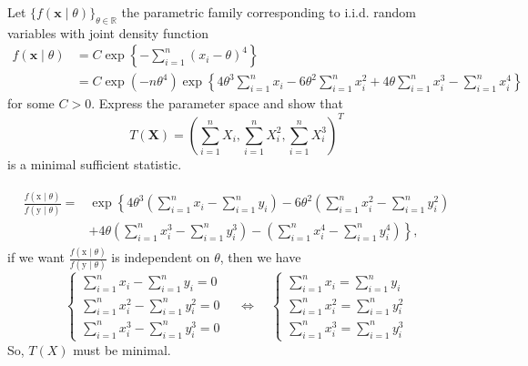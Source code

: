 \begin{ex}
    Let \(\{f(\mathbf{x} \mid \theta)\}_{\theta \in \mathbb{R}}\) the parametric family corresponding to i.i.d. random variables with joint density function
    \[
        \begin{aligned}
            f(\mathbf{x} \mid \theta)&=C \exp \left\{-\sum_{i=1}^{n}\left(x_{i}-\theta\right)^{4}\right\}\\
            &=C \exp \left(-n \theta^{4}\right) \exp \left\{4 \theta^{3} \sum_{i=1}^{n} x_{i}-6 \theta^{2} \sum_{i=1}^{n} x_{i}^{2}+4 \theta \sum_{i=1}^{n} x_{i}^{3}-\sum_{i=1}^{n} x_{i}^{4}\right\}
        \end{aligned}
    \]
    for some \(C>0\). Express the parameter space and show that
    \[
        T(\mathbf{X})=\left(\sum_{i=1}^{n} X_{i}, \sum_{i=1}^{n} X_{i}^{2}, \sum_{i=1}^{n} X_{i}^{3}\right)^T
    \]
    is a minimal sufficient statistic. 
\end{ex}

\begin{solution}
    \begin{align}
        \begin{aligned}
        \frac{f(\mathrm{x} \mid \theta)}{f(\mathrm{y} \mid \theta)}=& \exp \left\{4 \theta^{3}\left(\sum_{i=1}^{n} x_{i}-\sum_{i=1}^{n} y_{i}\right)-6 \theta^{2}\left(\sum_{i=1}^{n} x_{i}^{2}-\sum_{i=1}^{n} y_{i}^{2}\right)\right.\\
        &\left.+4 \theta\left(\sum_{i=1}^{n} x_{i}^{3}-\sum_{i=1}^{n} y_{i}^{3}\right)-\left(\sum_{i=1}^{n} x_{i}^{4}-\sum_{i=1}^{n} y_{i}^{4}\right)\right\}, 
        \end{aligned}
    \end{align}
    if we want $\frac{f(\mathrm{x} \mid \theta)}{f(\mathrm{y} \mid \theta)}$ is independent on $\theta$, then we have
    \[
        \left\{\begin{array} { l } 
            { \sum _ { i = 1 } ^ { n } x _ { i } - \sum _ { i = 1 } ^ { n } y _ { i } = 0 } \\
            { \sum _ { i = 1 } ^ { n } x _ { i } ^ { 2 } - \sum _ { i = 1 } ^ { n } y _ { i } ^ { 2 } = 0 } \\
            { \sum _ { i = 1 } ^ { n } x _ { i } ^ { 3 } - \sum _ { i = 1 } ^ { n } y _ { i } ^ { 3 } = 0 }
        \end{array}\right. \quad \Leftrightarrow \quad \left\{\begin{array}{l}
            \sum_{i=1}^{n} x_{i}=\sum_{i=1}^{n} y_{i} \\
            \sum_{i=1}^{n} x_{i}^{2}=\sum_{i=1}^{n} y_{i}^{2} \\
            \sum_{i=1}^{n} x_{i}^{3}=\sum_{i=1}^{n} y_{i}^{3}
        \end{array}\right.
    \]
    So, $T(X)$ must be minimal. 
\end{solution}

